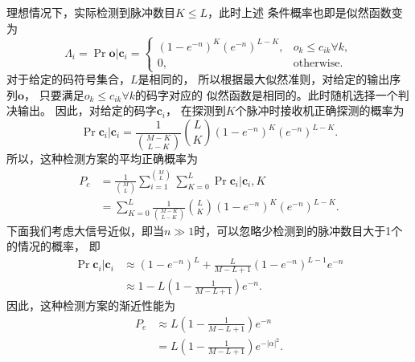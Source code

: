 理想情况下，实际检测到脉冲数目$K \le L$，此时上述
条件概率也即是似然函数变为
\begin{equation}
\Lambda_i = \Pr{\bm{o} | \bm{c}_i} = \begin{cases} 
                                        \left(1 - e^{-n} \right)^{K} \left(e^{-n} \right)^{L-K}, & o_k \le c_{ik} \forall k,\\
                                        0,                                                       & \text{otherwise}.
                                    \end{cases}
\end{equation}
对于给定的码符号集合，$L$是相同的，
所以根据最大似然准则，对给定的输出序列$\bm{o}$，
只要满足$o_k \le c_{ik} \forall k$的码字对应的
似然函数是相同的。此时随机选择一个判决输出。
因此，对给定的码字$\bm{c}_i$，
在探测到$K$个脉冲时接收机正确探测的概率为
\begin{equation}
\Pr{\bm{c}_i | \bm{c}_i} = \frac{1}{\binom{M-K}{L-K}} \binom{L}{K} \left(1 - e^{-n} \right)^{K} \left(e^{-n} \right)^{L-K}.
\end{equation}
所以，这种检测方案的平均正确概率为
\begin{equation}
\begin{split}
P_c &= \frac{1}{\binom{M}{L}}\sum_{i=1}^{\binom{M}{L}} \sum_{K=0}^{L} \Pr{\bm{c}_i | \bm{c}_i, K}  \\
    &= \sum_{K=0}^{L} \frac{1}{\binom{M-K}{L-K}} \binom{L}{K} \left(1 - e^{-n} \right)^{K} \left(e^{-n} \right)^{L-K}.
\end{split}
\end{equation}
下面我们考虑大信号近似，即当$n \gg 1$时，可以忽略少检测到的脉冲数目大于1个的情况的概率，
即
\begin{equation}
\begin{split}
\Pr{\bm{c}_i | \bm{c}_i} &\approx (1-e^{-n})^L + \frac{L}{M-L+1} (1-e^{-n})^{L-1} e^{-n} \\
                            &\approx 1 - L\left(1 - \frac{1}{M-L+1} \right)e^{-n}.
\end{split}
\end{equation}
因此，这种检测方案的渐近性能为
\begin{equation}
\begin{split}
P_e & \approx L\left(1 - \frac{1}{M-L+1} \right)e^{-n} \\
    & = L\left(1 - \frac{1}{M-L+1} \right)e^{-|\alpha|^2}.
\end{split}
\end{equation}



